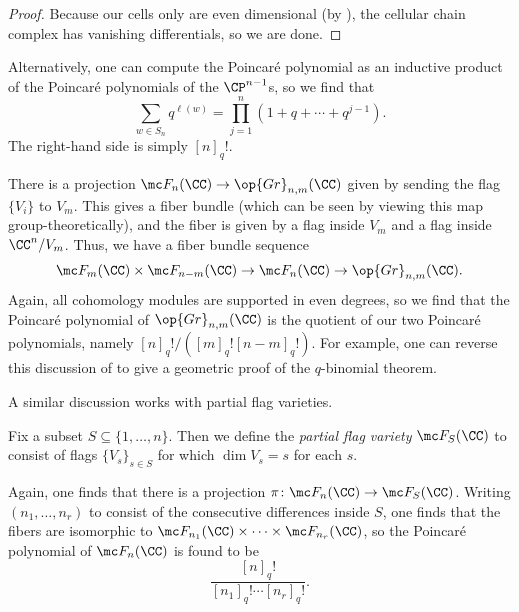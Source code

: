 \documentclass[../notes.tex]{subfiles}
\begin{document}
\begin{proof}
	Because our cells only are even dimensional (by ), the cellular chain complex has vanishing differentials, so we are done.
\end{proof}
\begin{remark}
	Alternatively, one can compute the Poincar\'e polynomial as an inductive product of the Poincar\'e polynomials of the $\CP^{n-1}$s, so we find that
	\[\sum_{w\in S_n}q^{\ell(w)}=\prod_{j=1}^n\left(1+q+\cdots+q^{j-1}\right).\]
	The right-hand side is simply $[n]_q!$.
\end{remark}
\begin{remark}
	There is a projection $\mc F_n(\CC)\to\op{Gr}_{n,m}(\CC)$ given by sending the flag $\{V_i\}$ to $V_m$. This gives a fiber bundle (which can be seen by viewing this map group-theoretically), and the fiber is given by a flag inside $V_m$ and a flag inside $\CC^n/V_m$. Thus, we have a fiber bundle sequence
	\[\mc F_m(\CC)\times\mc F_{n-m}(\CC)\to\mc F_n(\CC)\to\op{Gr}_{n,m}(\CC).\]
	Again, all cohomology modules are supported in even degrees, so we find that the Poincar\'e polynomial of $\op{Gr}_{n,m}(\CC)$ is the quotient of our two Poincar\'e polynomials, namely $[n]_q!/([m]_q![n-m]_q!)$. For example, one can reverse this discussion of  to give a geometric proof of the $q$-binomial theorem.
\end{remark}
A similar discussion works with partial flag varieties.
\begin{definition}
	Fix a subset $S\subseteq\{1,\ldots,n\}$. Then we define the \textit{partial flag variety} $\mc F_S(\CC)$ to consist of flags $\{V_s\}_{s\in S}$ for which $\dim V_s=s$ for each $s$.
\end{definition}
\begin{remark}
	Again, one finds that there is a projection $\pi\colon\mc F_n(\CC)\to\mc F_S(\CC)$. Writing $(n_1,\ldots,n_r)$ to consist of the consecutive differences inside $S$, one finds that the fibers are isomorphic to $\mc F_{n_1}(\CC)\times\cdots\times\mc F_{n_r}(\CC)$, so the Poincar\'e polynomial of $\mc F_n(\CC)$ is found to be
	\[\frac{[n]_q!}{[n_1]_q!\cdots[n_r]_q!}.\]
\end{remark}
\end{document}
